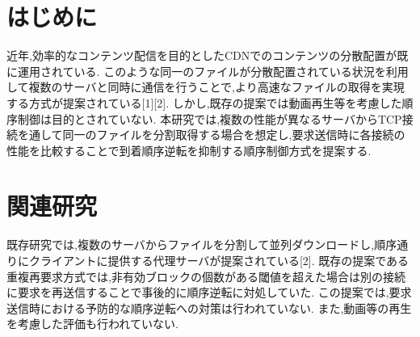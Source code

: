 \documentclass{ltjsarticle}
\begin{document}
 
\fontsize{9.6pt}{0pt}\selectfont
\section{はじめに}
\vspace{-2.75mm}
近年,効率的なコンテンツ配信を目的としたCDNでのコンテンツの分散配置が既に運用されている.
このような同一のファイルが分散配置されている状況を利用して複数のサーバと同時に通信を行うことで,より高速なファイルの取得を実現する方式が提案されている[1][2].
しかし,既存の提案では動画再生等を考慮した順序制御は目的とされていない.
本研究では,複数の性能が異なるサーバからTCP接続を通して同一のファイルを分割取得する場合を想定し,要求送信時に各接続の性能を比較することで到着順序逆転を抑制する順序制御方式を提案する.
\vspace{-7.75mm}

\section{関連研究}
\vspace{-2.75mm}
既存研究では,複数のサーバからファイルを分割して並列ダウンロードし,順序通りにクライアントに提供する代理サーバが提案されている[2].
既存の提案である重複再要求方式では,非有効ブロックの個数がある閾値を超えた場合は別の接続に要求を再送信することで事後的に順序逆転に対処していた.
この提案では,要求送信時における予防的な順序逆転への対策は行われていない.
また,動画等の再生を考慮した評価も行われていない.
\vspace{-7.75mm}
\end{document}

